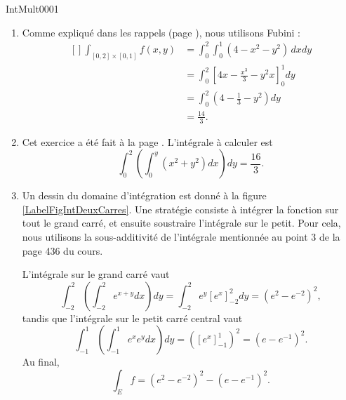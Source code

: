 
\begin{corrige}{IntMult0001}

\begin{enumerate}

\item
Comme expliqué dans les rappels (page \pageref{PgRapIntMultFubiniRect}), nous utilisons Fubini :
\begin{equation}
	\begin{aligned}[]
	\int_{[0,2]\times[0,1]}f(x,y)&=\int_0^2\int_0^1(4-x^2-y^2)\,dxdy\\
			&=\int_0^2\left[ 4x-\frac{ x^3 }{ 3 }-y^2x \right]_0^1dy\\
			&=\int_0^2\left( 4-\frac{1}{ 3 }-y^2 \right)dy\\
			&=\frac{ 14 }{ 3 }.
	\end{aligned}
\end{equation}

\item
Cet exercice a été fait à la page \pageref{PgRapIntMultFubiniTri}. L'intégrale à calculer est
\begin{equation}
	\int_0^2\left( \int_0^y(x^2+y^2)dx \right)dy=\frac{ 16 }{ 3 }.
\end{equation}

\item
Un dessin du domaine d'intégration est donné à la figure \ref{LabelFigIntDeuxCarres}. Une stratégie consiste à intégrer la fonction sur tout le grand carré, et ensuite soustraire l'intégrale sur le petit. Pour cela, nous utilisons la sous-additivité de l'intégrale mentionnée au point $3$ de la page 436 du cours.
\newcommand{\CaptionFigIntDeuxCarres}{Un domaine d'intégration.}

L'intégrale sur le grand carré vaut
\begin{equation}
		\int_{-2}^2\left( \int_{-2}^2 e^{x+y}dx \right)dy=\int_{-2}^2e^y[e^x]_{-2}^2dy=(e^2- e^{-2})^2,
\end{equation}
tandis que l'intégrale sur le petit carré central vaut
\begin{equation}
		\int_{-1}^1\left( \int_{-1}^1 e^xe^ydx \right)dy=\left( [e^x]_{-1}^1 \right)^2=\left( e-e^{-1} \right)^2.
\end{equation}
Au final,
\begin{equation}
	\int_Ef=(e^2-e^{-2})^2-(e-e^{-1})^2.
\end{equation}


\end{enumerate}
\end{corrige}
